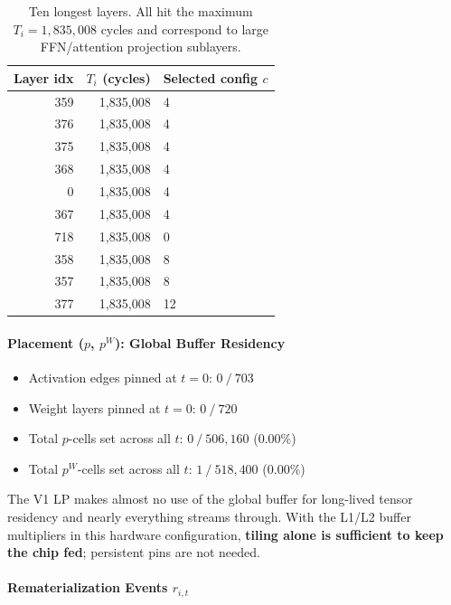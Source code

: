 \begin{table}[h]
\centering
\caption{Ten longest layers. All hit the maximum $T_i =
1{,}835{,}008$ cycles and correspond to large FFN/attention
projection sublayers.}
\label{tab:longest_layers}
\begin{tabular}{rrl}
\toprule
\textbf{Layer idx} & \textbf{$T_i$ (cycles)} & \textbf{Selected config $c$} \\
\midrule
359 & 1{,}835{,}008 &  4 \\
376 & 1{,}835{,}008 &  4 \\
375 & 1{,}835{,}008 &  4 \\
368 & 1{,}835{,}008 &  4 \\
  0 & 1{,}835{,}008 &  4 \\
367 & 1{,}835{,}008 &  4 \\
718 & 1{,}835{,}008 &  0 \\
358 & 1{,}835{,}008 &  8 \\
357 & 1{,}835{,}008 &  8 \\
377 & 1{,}835{,}008 & 12 \\
\bottomrule
\end{tabular}
\end{table}

\paragraph{Placement ($p$, $p^W$): Global Buffer Residency}

\begin{itemize}[leftmargin=1.4em, itemsep=2pt]
    \item Activation edges pinned at $t=0$: $0\ /\ 703$
    \item Weight layers pinned at $t=0$: $0\ /\ 720$
    \item Total $p$-cells set across all $t$:
          $0\ /\ 506{,}160$ ($0.00\%$)
    \item Total $p^W$-cells set across all $t$:
          $1\ /\ 518{,}400$ ($0.00\%$)
\end{itemize}

\noindent The V1 LP makes almost no use of the global buffer for
long-lived tensor residency and nearly everything streams through.
With the L1/L2 buffer multipliers in this hardware configuration,
\textbf{tiling alone is sufficient to keep the chip fed}; persistent pins are not needed.

\paragraph{Rematerialization Events $r_{i,t}$}

